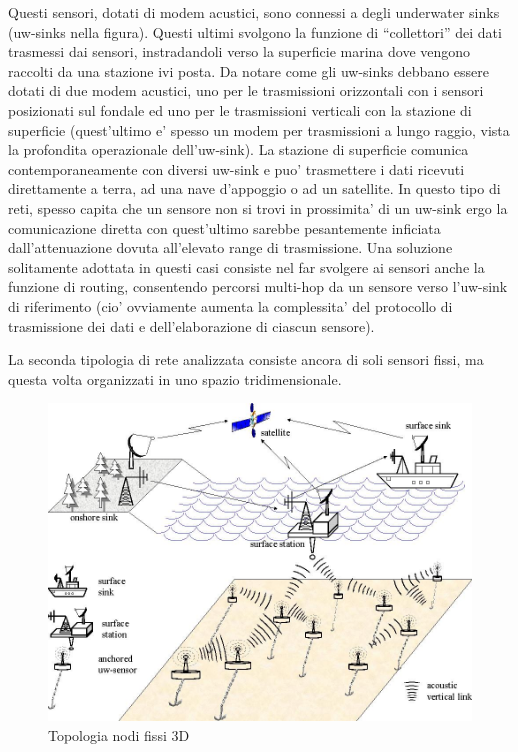 \documentclass[Lau,binding=0.6cm]{sapthesis}
\begin{document}
Questi sensori, dotati di modem acustici, sono connessi a degli underwater sinks (uw-sinks nella figura). Questi ultimi svolgono la funzione di ``collettori'' dei dati trasmessi dai sensori, instradandoli verso la superficie marina dove vengono raccolti da una stazione ivi posta. Da notare come gli uw-sinks debbano essere dotati di due modem acustici, uno per le trasmissioni orizzontali con i sensori posizionati sul fondale ed uno per le trasmissioni verticali con la stazione di superficie (quest'ultimo e' spesso un modem per trasmissioni a lungo raggio, vista la profondita operazionale dell'uw-sink). La stazione di superficie comunica contemporaneamente con diversi uw-sink e puo' trasmettere i dati ricevuti direttamente a terra, ad una nave d'appoggio o ad un satellite.
In questo tipo di reti, spesso capita che un sensore non si trovi in prossimita' di un uw-sink ergo la comunicazione diretta con quest'ultimo sarebbe pesantemente inficiata dall'attenuazione dovuta all'elevato range di trasmissione. Una soluzione solitamente adottata in questi casi consiste nel far svolgere ai sensori anche la funzione di routing, consentendo percorsi multi-hop da un sensore verso l'uw-sink di riferimento (cio' ovviamente aumenta la complessita' del protocollo di trasmissione dei dati e dell'elaborazione di ciascun sensore).

La seconda tipologia di rete analizzata consiste ancora di soli sensori fissi, ma questa volta organizzati in uno spazio tridimensionale.

\begin{figure}[H]
    \centering
	\includegraphics[scale=0.3]{3D_arch.jpg}
	\caption{ Topologia nodi fissi 3D}
	\label{fig:}
\end{figure}
\end{document}
